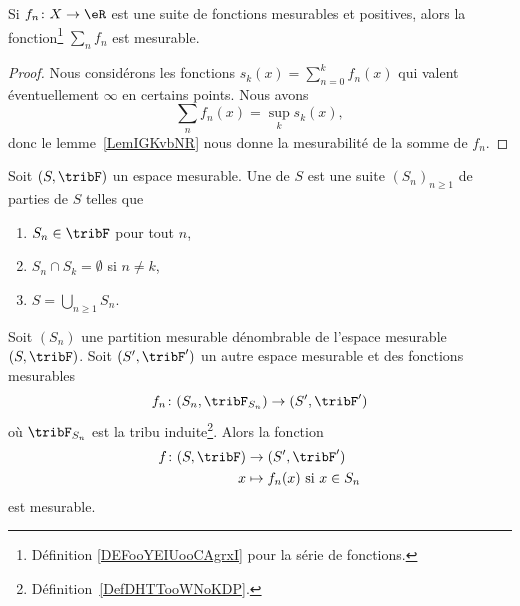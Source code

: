 \begin{proposition}\label{PropFYPEOIJ}
	Si \( f_n\colon X\to \eR\) est une suite de fonctions mesurables et positives, alors la fonction\footnote{Définition \ref{DEFooYEIUooCAgrxI} pour la série de fonctions.} \( \sum_nf_n\) est mesurable.
\end{proposition}

\begin{proof}
	Nous considérons les fonctions \( s_k(x)=\sum_{n=0}^kf_n(x)\) qui valent éventuellement \( \infty\) en certains points. Nous avons
	\begin{equation}
		\sum_nf_n(x)=\sup_ks_k(x),
	\end{equation}
	donc le lemme~\ref{LemIGKvbNR} nous donne la mesurabilité de la somme de \( f_n\).
\end{proof}

\begin{definition}      \label{ooUDHFooJjKscR}
	Soit \( (S,\tribF)\) un espace mesurable.
	Une  de \( S\) est une suite  \( (S_n)_{n\geq 1}\) de parties de \( S\) telles que
	\begin{enumerate}
		\item
		      \( S_n\in\tribF\) pour tout \( n\),
		\item
		      \( S_n\cap S_k=\emptyset\) si \( n\neq k\),
		\item
		      \( S=\bigcup_{n\geq 1}S_n\).
	\end{enumerate}
\end{definition}

\begin{lemma}     \label{LEMooXAPQooPpZUmP}
	Soit \( (S_n)\) une partition mesurable dénombrable de l'espace mesurable \( (S,\tribF)\). Soit \( (S',\tribF')\) un autre espace mesurable et des fonctions mesurables
	\begin{equation}
		f_n\colon (S_n,\tribF_{S_n})\to (S',\tribF')
	\end{equation}
	où \( \tribF_{S_n}\) est la tribu induite\footnote{Définition~\ref{DefDHTTooWNoKDP}.}. Alors la fonction
	\begin{equation}
		\begin{aligned}
			f\colon (S,\tribF) & \to (S',\tribF')                    \\
			x                  & \mapsto f_n(x) \text{ si } x\in S_n
		\end{aligned}
	\end{equation}
	est mesurable.
\end{lemma}

